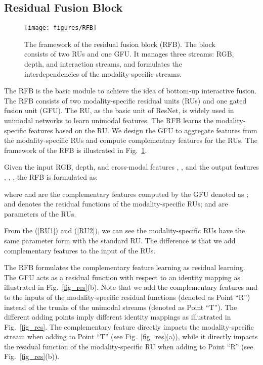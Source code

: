 \documentclass[letterpaper, 10 pt, conference]{ieeeconf}
\begin{document}
	\subsection{Residual Fusion Block}
	\begin{figure}[!tb]
		\centering
		\texttt{[image: figures/RFB]}
		\caption{The framework of the residual fusion block (RFB). The block consists of two RUs and one GFU. It manages three streams: RGB, depth, and interaction streams, and formulates the interdependencies of the modality-specific streams. }
		\label{fig_RFB}
	\end{figure}
The RFB is the basic module to achieve the idea of bottom-up interactive fusion. The RFB consists of two modality-specific residual units (RUs) and one gated fusion unit (GFU). The RU, as the basic unit of ResNet\cite{he2016deep}, is widely used in unimodal networks to learn unimodal features. The RFB learns the modality-specific features based on the RU. We design the GFU to aggregate features from the modality-specific RUs and compute complementary features for the RUs. The framework of the RFB is illustrated in Fig.~\ref{fig_RFB}.
	
	
	Given the input RGB, depth, and cross-modal features , ,  and the output features , , , the RFB is formulated as:
	
	
	
	where  and  are the complementary features computed by the GFU denoted as ;  and  denotes the residual functions of the modality-specific RUs;  and  are parameters of the RUs. 
	
	From the (\ref{RU1}) and (\ref{RU2}), we can see the modality-specific RUs have the same parameter form with the standard RU\cite{he2016deep}. The difference is that we add complementary features to the input of the RUs. 
	
	The RFB formulates the complementary feature learning as residual learning. The GFU acts as a residual function with respect to an identity mapping as illustrated in Fig.~\ref{fig_res}(b). Note that we add the complementary features  and  to the inputs of the modality-specific residual functions (denoted as Point ``R'') instead of the trunks of the unimodal streams (denoted as Point ``T''). The different adding points imply different identity mappings as illustrated in Fig.~\ref{fig_res}. The complementary feature directly impacts the modality-specific stream when adding to Point ``T'' (see Fig.~\ref{fig_res}(a)), while it directly impacts the residual function of the modality-specific RU when adding to Point ``R'' (see Fig.~\ref{fig_res}(b)).
	
\end{document}
